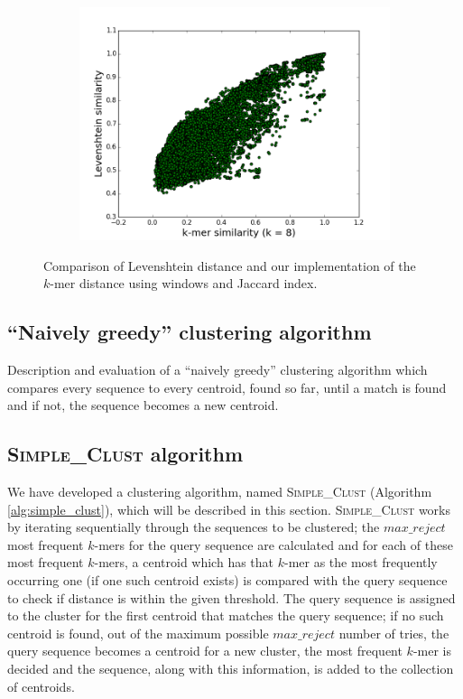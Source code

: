 \begin{figure}
  \centering
        \begin{subfigure}[b]{0.5\textwidth}
        \includegraphics[scale=0.34]{graphics/k8.png}
        \end{subfigure}
\caption{Comparison of Levenshtein distance and our implementation of the
$k$-mer distance using windows and Jaccard index.}
\label{fig:Levenshtein_vs_Kmer}
\end{figure}


\subsection{``Naively greedy'' clustering algorithm} %
Description and evaluation of a ``naively greedy'' clustering algorithm which
compares every sequence to every centroid, found so far, until a match is found
and if not, the sequence becomes a new centroid.


\subsection{\textsc{Simple\_Clust} algorithm}
We have developed a clustering algorithm, named \textsc{Simple\_Clust}
(Algorithm \ref{alg:simple_clust}), which will be described in this section.
\textsc{Simple\_Clust} works by iterating sequentially through the sequences to
be clustered; the $max\_reject$ most frequent $k$-mers for the query sequence
are calculated and for each of these most frequent $k$-mers, a centroid which
has that $k$-mer as the most frequently occurring one (if one such centroid
exists) is compared with the query sequence to check if distance is within the
given threshold. The query sequence is assigned to the cluster for the first
centroid that matches the query sequence; if no such centroid is found, out of
the maximum possible $max\_reject$ number of tries, the query sequence becomes
a centroid for a new cluster, the most frequent $k$-mer is decided and the
sequence, along with this information, is added to the collection of centroids.

